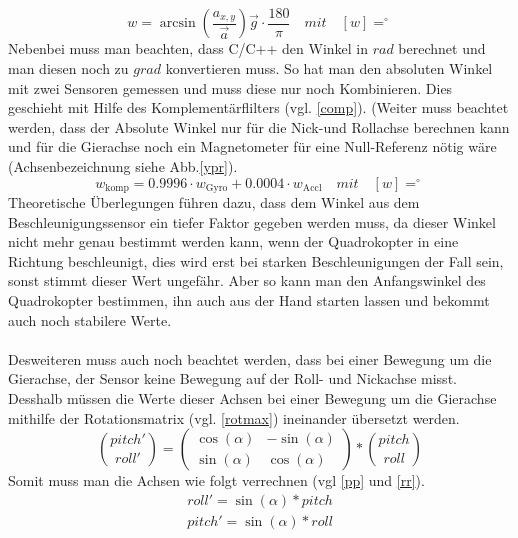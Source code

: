 \documentclass[12pt,a4paper, ngerman]{article}
\begin{document}
\begin{equation}\label{gangle}
w=\arcsin(\frac{a_{x,y}}{\vec{a}}
)
\vec{g}\cdot \frac{180}{\pi} \quad mit \quad [w]=^\circ
\end{equation}
Nebenbei muss man beachten, dass C/C++ den Winkel in $rad$ berechnet und man diesen noch zu $grad$ konvertieren muss. So hat man den absoluten Winkel mit zwei Sensoren gemessen und muss diese nur noch Kombinieren. Dies geschieht mit Hilfe des Komplementärflilters (vgl. \ref{comp})\cite{website:Digikey_Komplementaerfilter}. (Weiter muss beachtet werden, dass der Absolute Winkel nur für die Nick-und Rollachse berechnen kann und für die Gierachse noch ein Magnetometer für eine Null-Referenz nötig wäre (Achsenbezeichnung siehe Abb.\ref{ypr}).
\begin{equation}\label{comp}
w_{\text{komp}}=0.9996\cdot w_{\text{Gyro}}+0.0004\cdot w_{\text{Accl}} \quad mit \quad [w]=^\circ
\end{equation}
Theoretische Überlegungen führen dazu, dass dem Winkel aus dem Beschleunigungssensor ein tiefer Faktor gegeben werden muss, da dieser Winkel nicht mehr genau bestimmt werden kann, wenn der Quadrokopter in eine Richtung beschleunigt, dies wird erst bei starken Beschleunigungen der Fall sein, sonst stimmt dieser Wert ungefähr. Aber so kann man den Anfangswinkel des Quadrokopter bestimmen, ihn auch aus der Hand starten lassen und bekommt auch noch stabilere Werte.\\ \\
Desweiteren muss auch noch beachtet werden, dass bei einer Bewegung um die Gierachse, der Sensor keine Bewegung auf der Roll- und Nickachse misst. Desshalb müssen die Werte dieser Achsen bei einer Bewegung um die Gierachse mithilfe der Rotationsmatrix (vgl. \ref{rotmax}) ineinander übersetzt werden.
\begin{equation}\label{rotmax}
\binom{pitch'}{roll'}=\begin{pmatrix}
\cos(\alpha) & -\sin(\alpha)\\ 
\sin(\alpha) & \cos(\alpha)
\end{pmatrix}*\binom{pitch}{roll}
\end{equation}
Somit muss man die Achsen wie folgt verrechnen (vgl \ref{pp} und \ref{rr}).
\begin{align}
roll' = \sin(\alpha)*pitch \label{pp}\\
pitch'= \sin(\alpha)*roll \label{rr}
\end{align} 
\end{document}
